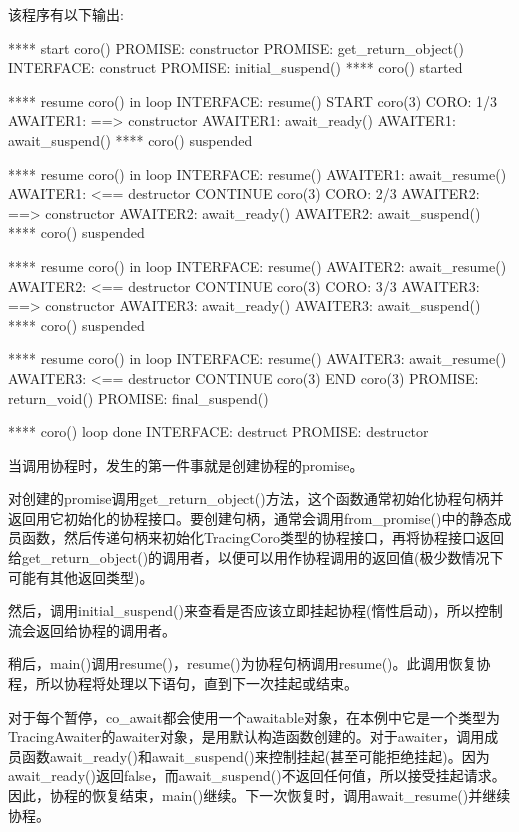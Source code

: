 该程序有以下输出:

\begin{shell}
**** start coro()
      PROMISE: constructor
      PROMISE: get_return_object()
        INTERFACE: construct
      PROMISE: initial_suspend()
**** coro() started

**** resume coro() in loop
        INTERFACE: resume()
  START coro(3)
  CORO: 1/3
          AWAITER1: ==> constructor
          AWAITER1: await_ready()
          AWAITER1: await_suspend()
**** coro() suspended

**** resume coro() in loop
        INTERFACE: resume()
          AWAITER1: await_resume()
          AWAITER1: <== destructor
  CONTINUE coro(3)
  CORO: 2/3
          AWAITER2: ==> constructor
          AWAITER2: await_ready()
          AWAITER2: await_suspend()
**** coro() suspended

**** resume coro() in loop
        INTERFACE: resume()
          AWAITER2: await_resume()
          AWAITER2: <== destructor
  CONTINUE coro(3)
  CORO: 3/3
          AWAITER3: ==> constructor
          AWAITER3: await_ready()
          AWAITER3: await_suspend()
**** coro() suspended

**** resume coro() in loop
        INTERFACE: resume()
          AWAITER3: await_resume()
          AWAITER3: <== destructor
  CONTINUE coro(3)
  END coro(3)
      PROMISE: return_void()
      PROMISE: final_suspend()

**** coro() loop done
        INTERFACE: destruct
      PROMISE: destructor
\end{shell}

当调用协程时，发生的第一件事就是创建协程的promise。

对创建的promise调用get\_return\_object()方法，这个函数通常初始化协程句柄并返回用它初始化的协程接口。要创建句柄，通常会调用from\_promise()中的静态成员函数，然后传递句柄来初始化TracingCoro类型的协程接口，再将协程接口返回给get\_return\_object()的调用者，以便可以用作协程调用的返回值(极少数情况下可能有其他返回类型)。

然后，调用initial\_suspend()来查看是否应该立即挂起协程(惰性启动)，所以控制流会返回给协程的调用者。

稍后，main()调用resume()，resume()为协程句柄调用resume()。此调用恢复协程，所以协程将处理以下语句，直到下一次挂起或结束。

对于每个暂停，co\_await都会使用一个awaitable对象，在本例中它是一个类型为TracingAwaiter的awaiter对象，是用默认构造函数创建的。对于awaiter，调用成员函数await\_ready()和await\_suspend()来控制挂起(甚至可能拒绝挂起)。因为await\_ready()返回false，而await\_suspend()不返回任何值，所以接受挂起请求。因此，协程的恢复结束，main()继续。下一次恢复时，调用await\_resume()并继续协程。

